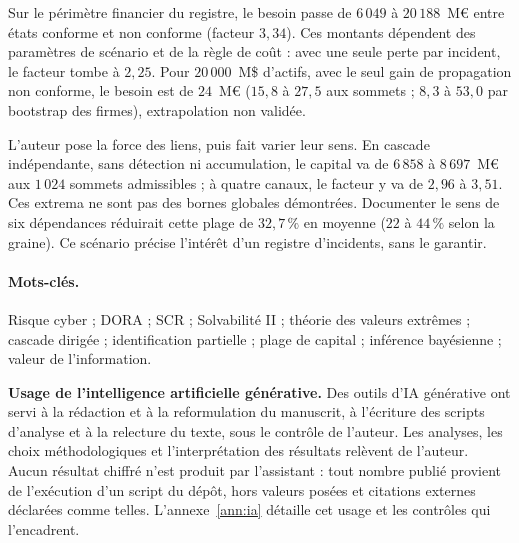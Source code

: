Sur le périmètre financier du registre, le besoin passe de $6\,049$ à $20\,188$~M\euro{} entre états
conforme et non conforme (facteur $3{,}34$). Ces montants dépendent des paramètres de scénario
et de la règle de coût : avec une seule perte par incident, le facteur tombe à $2{,}25$. Pour $20\,000$~M\$ d'actifs, avec le seul gain de propagation non conforme, le besoin est de
$24$~M\euro{} ($15{,}8$ à $27{,}5$ aux sommets ; $8{,}3$ à $53{,}0$ par bootstrap des
firmes), extrapolation non validée.

L'auteur pose la force des liens, puis fait varier leur sens. En cascade indépendante, sans détection ni accumulation, le capital
va de $6\,858$ à $8\,697$~M\euro{} aux $1\,024$ sommets admissibles ; à quatre canaux, le facteur y va de
$2{,}96$ à $3{,}51$. Ces extrema ne sont pas des bornes globales démontrées.
Documenter le sens de six dépendances réduirait cette plage de $32{,}7\,\%$ en moyenne
($22$ à $44\,\%$ selon la graine). Ce scénario précise l'intérêt d'un registre d'incidents,
sans le garantir.

\paragraph{Mots-clés.} Risque cyber ; DORA ; SCR ; Solvabilité II ; théorie des valeurs
extrêmes ; cascade dirigée ; identification partielle ; plage de capital ; inférence
bayésienne ; valeur de l'information.

\bigskip
\noindent\textbf{Usage de l'intelligence artificielle générative.} Des outils d'IA générative
ont servi à la rédaction et à la reformulation du manuscrit, à l'écriture des scripts d'analyse
et à la relecture du texte, sous le contrôle de l'auteur. Les analyses, les choix
méthodologiques et l'interprétation des résultats relèvent de l'auteur. Aucun résultat chiffré
n'est produit par l'assistant : tout nombre publié provient de l'exécution d'un script du dépôt, hors valeurs posées et citations externes déclarées comme telles.
L'annexe~\ref{ann:ia} détaille cet usage et les contrôles qui l'encadrent.


